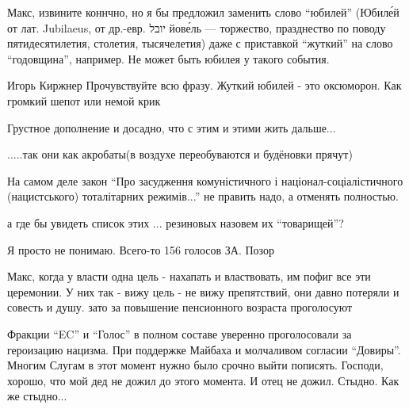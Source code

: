  
 
 
 
 
\begin{itemize}


Макс, извините коннчно, но я бы предложил заменить слово \enquote{юбилей} (Юбиле́й от
лат. Jubilaeus, от др.-евр. יובל йове́ль — торжество, празднество по поводу
пятидесятилетия, столетия, тысячелетия) даже с приставкой \enquote{жуткий} на слово
\enquote{годовщина}, например. Не может быть юбилея у такого события.


Игорь Киржнер Прочувствуйте всю фразу. Жуткий юбилей - это оксюморон. Как громкий шепот или немой крик


Грустное дополнение и досадно, что с этим и этими жить дальше...


.....так они как акробаты(в воздухе переобуваются и будёновки прячут)


На самом деле закон \enquote{Про засудження комуністичного і
націонал-соціалістичного (нацистського) тоталітарних режимів...} не править
надо, а отменять полностью.


а где бы увидеть список этих ... резиновых назовем их \enquote{товарищей}?


Я просто не понимаю. Всего-то 156 голосов ЗА. Позор


Макс, когда у власти одна цель - нахапать и властвовать, им пофиг все эти
церемонии. У них так - вижу цель - не вижу препятствий, они давно потеряли и
совесть и душу. зато за повышение пенсионного возраста проголосуют


Фракции \enquote{EC} и \enquote{Голос} в полном составе уверенно проголосовали за героизацию
нацизма. При поддержке Майбаха и молчаливом согласии \enquote{Довиры}. Многим Слугам в
этот момент нужно было срочно выйти пописять. Господи, хорошо, что мой дед не
дожил до этого момента. И отец не дожил. Стыдно. Как же стыдно...


\end{itemize}
